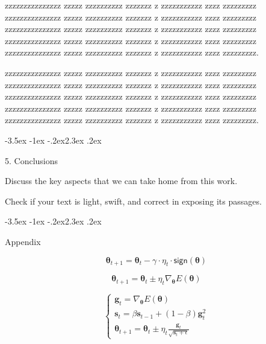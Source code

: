 \documentclass[prl,twocolumn]{revtex4-1}
\makeatletter
\renewcommand{\section}{\@startsection{section}{1}{\z@}%
	{-3.5ex \@plus -1ex \@minus -.2ex}{2.3ex \@plus.2ex}%
	{\normalfont\bfseries\raggedright}}
\makeatother
\begin{document}
  zzzzzzzzzzzzzzz zzzzz zzzzzzzzzz zzzzzzz z zzzzzzzzzzz zzzz zzzzzzzzz
  zzzzzzzzzzzzzzz zzzzz zzzzzzzzzz zzzzzzz z zzzzzzzzzzz zzzz zzzzzzzzz
  zzzzzzzzzzzzzzz zzzzz zzzzzzzzzz zzzzzzz z zzzzzzzzzzz zzzz zzzzzzzzz
  zzzzzzzzzzzzzzz zzzzz zzzzzzzzzz zzzzzzz z zzzzzzzzzzz zzzz zzzzzzzzz
  zzzzzzzzzzzzzzz zzzzz zzzzzzzzzz zzzzzzz z zzzzzzzzzzz zzzz zzzzzzzzz.

  


  zzzzzzzzzzzzzzz zzzzz zzzzzzzzzz zzzzzzz z zzzzzzzzzzz zzzz zzzzzzzzz
  zzzzzzzzzzzzzzz zzzzz zzzzzzzzzz zzzzzzz z zzzzzzzzzzz zzzz zzzzzzzzz
  zzzzzzzzzzzzzzz zzzzz zzzzzzzzzz zzzzzzz z zzzzzzzzzzz zzzz zzzzzzzzz
  zzzzzzzzzzzzzzz zzzzz zzzzzzzzzz zzzzzzz z zzzzzzzzzzz zzzz zzzzzzzzz
  zzzzzzzzzzzzzzz zzzzz zzzzzzzzzz zzzzzzz z zzzzzzzzzzz zzzz zzzzzzzzz.

\section{5. Conclusions}

Discuss the key aspects that we can take home from this work.

Check if your text is light, swift, and correct in exposing its passages.


\section{Appendix}

\begin{equation}
	\boldsymbol{\theta}_{t+1}=\boldsymbol{\theta}_t-\gamma\cdot{\eta_t}\cdot{\mathsf{sign}(\boldsymbol{\theta})}
	\label{eq:regu}
\end{equation}

\begin{equation}
	\boldsymbol{\theta}_{t+1}=\boldsymbol{\theta}_t\pm\eta_t\nabla_{\boldsymbol{\theta}}{E(\boldsymbol{\theta})}
	\label{eq:sgd}
\end{equation}


\begin{equation}
	\begin{cases}
		\boldsymbol{g}_t=\nabla_{\boldsymbol{\theta}}{E(\boldsymbol{\theta})} \\
		\boldsymbol{s}_t=\beta{\boldsymbol{s}_{t-1}}+(1-\beta)\boldsymbol{g}_t^2 \\
		\boldsymbol{\theta}_{t+1}=\boldsymbol{\theta}_t\pm\eta_t\frac{\boldsymbol{g}_t}{\sqrt{\boldsymbol{s}_t+\epsilon}}
	\end{cases}
	\label{eq:rmsprop}
\end{equation}
\end{document}
